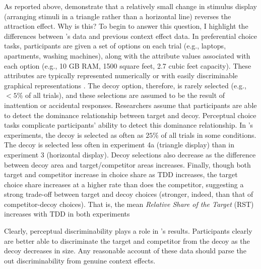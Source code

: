 \documentclass{umassthesis}          %
\begin{document}
As reported above, \textcite{spektorWhenGoodLooks2018b} demonstrate that a relatively small change in stimulus display (arranging stimuli in a triangle rather than a horizontal line) reverses the attraction effect. Why is this? To begin to answer this question, I highlight the differences between \textcite{spektorWhenGoodLooks2018b}'s data and previous context effect data. In preferential choice tasks, participants are given a set of options on each trial (e.g., laptops, apartments, washing machines), along with the attribute values associated with each option (e.g., 10 GB RAM, 1500 square feet, 2.7 cubic feet capacity). These attributes are typically represented numerically \parencite{hayes2024attribute,banerjeeFactorsThatPromote2024} or with easily discriminable graphical representations \parencite{cataldoComparisonProcessAccount2019b}. The decoy option, therefore, is rarely selected (e.g., $<5\%$ of all trials), and these selections are assumed to be the result of inattention or accidental responses. Researchers assume that participants are able to detect the dominance relationship between target and decoy. Perceptual choice tasks complicate participants' ability to detect this dominance relationship. In \textcite{spektorWhenGoodLooks2018b}'s experiments, the decoy is selected as often as $25\%$ of all trials in some conditions. The decoy is selected less often in experiment 4a (triangle display) than in experiment 3 (horizontal display). Decoy selections also decrease as the difference between decoy area and target/competitor areas increases. Finally, though both target and competitor increase in choice share as TDD increases, the target choice share increases at a higher rate than does the competitor, suggesting a strong trade-off between target and decoy choices (stronger, indeed, than that of competitor-decoy choices). That is, the mean \textit{Relative Share of the Target} (RST) \parencite{berkowitschRigorouslyTestingMultialternative2014b} increases with TDD in both experiments %

Clearly, perceptual discriminability plays a role in \textcite{spektorWhenGoodLooks2018b}'s results. Participants clearly are better able to discriminate the target and competitor from the decoy as the decoy decreases in size. Any reasonable account of these data should parse the out discriminability from genuine context effects. 
\end{document}
